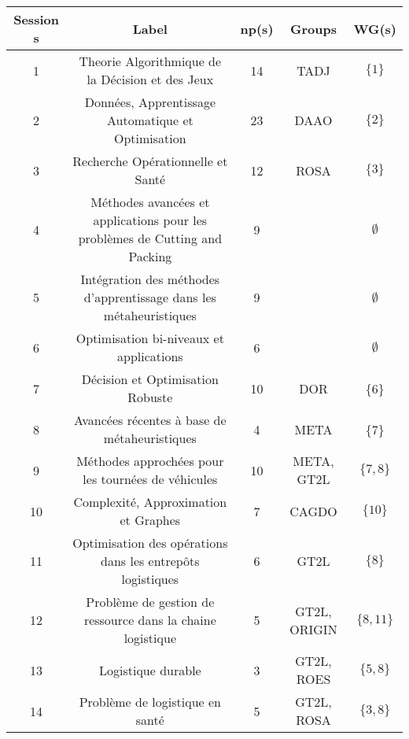 \documentclass{article}
\begin{document}
\begin{center} \hspace*{-4cm} \scriptsize
\begin{tabular}{ |c|c|c|c|c| } 
 \hline
 \textbf{Session s} & \textbf{Label} & \textbf{np(s)} &  \textbf{Groups} & \textbf{WG(s)} \\ 
 \hline
 
 1 & Theorie Algorithmique de la Décision et des Jeux & 14 & TADJ & $\{1\}$\\ 
 
 2 & Données, Apprentissage Automatique et Optimisation & 23 & DAAO & $\{2\}$ \\ 
 
 3 & Recherche Opérationnelle et Santé & 12 & ROSA & $\{3\}$\\ 
 
 4 & Méthodes avancées et applications pour les problèmes de Cutting and Packing & 9 & & $\emptyset$ \\
 
 5 & Intégration des méthodes d'apprentissage dans les métaheuristiques
 & 9 & & $\emptyset$\\ 
 
 6 & Optimisation bi-niveaux et applications
 & 6 & & $\emptyset$ \\ 
 
 7 & Décision et Optimisation Robuste
 & 10 & DOR & \{6\}\\
 
 8 & Avancées récentes à base de métaheuristiques
 & 4 & META & \{7\} \\

 9 & Méthodes approchées pour les tournées de véhicules
 & 10 & META, GT2L & $\{7,8\}$\\ 
 
 10 & Complexité, Approximation et Graphes
 & 7 & CAGDO & $\{10\}$ \\ 
 
 11 & Optimisation des opérations dans les entrepôts logistiques
 & 6 & GT2L & $\{8\}$\\ 
 
 12 & Problème de gestion de ressource dans la chaine logistique
 & 5 & GT2L, ORIGIN & $\{8,11\}$  \\
 
 13 & Logistique durable & 3 & GT2L, ROES & $\{5,8\}$\\ 
 
 14 & Problème de logistique en santé 
 & 5 & GT2L, ROSA & $\{3,8\}$ \\ 
 

\end{tabular}
\end{center}
\end{document}
